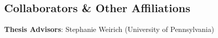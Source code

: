 




\subsection*{Collaborators \& Other Affiliations}

\noindent



\textbf{Thesis Advisors}: Stephanie Weirich (University of Pennsylvania)
